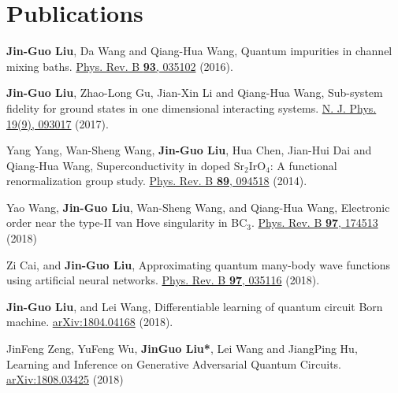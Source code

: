 \documentclass[letterpaper]{article}
\renewenvironment{itemize}{
  \begin{list}{}{
    \setlength{\leftmargin}{1.5em}
  }
}{
  \end{list}
}
\begin{document}
\section*{Publications}
\begin{itemize}
    \item [1] {\bf Jin-Guo Liu}, Da Wang and Qiang-Hua Wang, Quantum impurities in channel mixing baths. \href{https://journals.aps.org/prb/abstract/10.1103/PhysRevB.93.035102}{Phys. Rev. B {\bf 93}, 035102} (2016).
    \item [2] {\bf Jin-Guo Liu}, Zhao-Long Gu, Jian-Xin Li and Qiang-Hua Wang, Sub-system fidelity for ground states in one dimensional interacting systems. \href{http://iopscience.iop.org/article/10.1088/1367-2630/aa6a4b}{N. J. Phys. 19(9), 093017} (2017).
    \item [3] Yang Yang, Wan-Sheng Wang, {\bf Jin-Guo Liu}, Hua Chen, Jian-Hui Dai and Qiang-Hua Wang, Superconductivity in doped ${\mathrm{Sr}}_{2}{\mathrm{IrO}}_{4}$: A functional renormalization group study. \href{https://journals.aps.org/prb/abstract/10.1103/PhysRevB.89.094518}{Phys. Rev. B {\bf 89}, 094518} (2014).
    \item [4] Yao Wang, {\bf Jin-Guo Liu}, Wan-Sheng Wang, and Qiang-Hua Wang, Electronic order near the type-II van Hove singularity in BC${}_3$. \href{https://journals.aps.org/prb/abstract/10.1103/PhysRevB.97.174513}{Phys. Rev. B {\bf 97}, 174513} (2018)
    \item [5] Zi Cai, and {\bf Jin-Guo Liu}, Approximating quantum many-body wave functions using artificial neural networks. \href{https://journals.aps.org/prb/abstract/10.1103/PhysRevB.97.035116}{Phys. Rev. B {\bf 97}, 035116} (2018).
    \item [6] {\bf Jin-Guo Liu}, and Lei Wang, Differentiable learning of quantum circuit Born machine. \href{https://arxiv.org/abs/1804.04168}{arXiv:1804.04168} (2018).
    \item [7] JinFeng Zeng, YuFeng Wu, {\bf JinGuo Liu*}, Lei Wang and JiangPing Hu, Learning and Inference on Generative Adversarial Quantum Circuits. \href{https://arxiv.org/abs/1808.03425}{arXiv:1808.03425} (2018)
\end{itemize}
\end{document}
